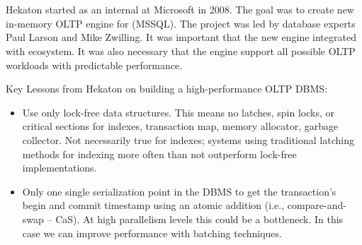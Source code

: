 \documentclass[11pt]{article}
\begin{document}
\maketitle
\thispagestyle{plain}

\section{}
Hekaton started as an internal at Microsoft in 2008. The goal was to create new in-memory OLTP 
engine for  (MSSQL). The project was led by database experts Paul 
Larson and Mike Zwilling. It was important that the new 
engine integrated with  ecosystem. It was also necessary that the engine support all 
possible OLTP workloads with predictable performance.

Key Lessons from Hekaton on building a high-performance OLTP DBMS:
\begin{itemize}
    \item
    Use only lock-free data structures. This means no latches, spin locks, or critical 
    sections for indexes, transaction map, memory allocator, garbage collector.
    Not necessarily true for indexes; systems using traditional latching methods for indexing more 
    often than not outperform lock-free implementations.
        
    \item
    Only one single serialization point in the DBMS to get the transaction's begin and commit 
    timestamp using an atomic addition (i.e., compare-and-swap -- CaS). At high parallelism levels 
    this could be a bottleneck. In this case we can improve performance with batching 
    techniques.
\end{itemize}
\end{document}
